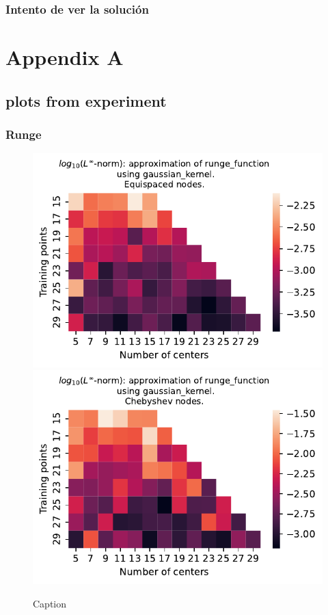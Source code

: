 \documentclass[12pt]{report} %
\begin{document}
\subsection*{Intento de ver la solución}






\clearpage


\printbibliography




\chapter*{Appendix A}\label{appendix-1d}

\section*{plots from experiment}

\subsection*{Runge}

\begin{figure}[ht]
  \centering

  \includegraphics[width=.49\textwidth]{imagenes/experiments/1d/variational/runge_function-Kgaussian_kernel-Equi.pdf}
  \includegraphics[width=.49\textwidth]{imagenes/experiments/1d/variational/runge_function-Kgaussian_kernel-Cheb.pdf}
  \caption{Caption}
  \label{fig:runge-gaussian}
\end{figure}
\end{document}

